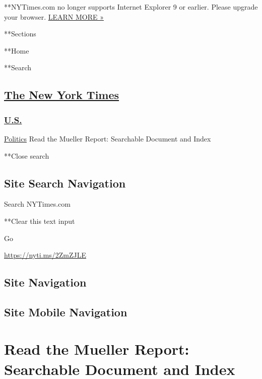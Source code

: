  **NYTimes.com no longer supports Internet Explorer 9 or earlier. Please
upgrade your browser.
\href{http://www.nytimes3xbfgragh.onion/content/help/site/ie9-support.html}{LEARN
MORE »}

**Sections

**Home

**Search

\hypertarget{the-new-york-times}{%
\subsection{\texorpdfstring{\href{http://www.nytimes3xbfgragh.onion/}{The
New York Times}}{The New York Times}}\label{the-new-york-times}}

\hypertarget{-us-}{%
\subsubsection{\texorpdfstring{
\href{https://www.nytimes3xbfgragh.onion/section/us}{U.S.}
}{ U.S. }}\label{-us-}}

 \href{/section/politics}{Politics} \textbar{}Read the Mueller Report:
Searchable Document and Index

**Close search

\hypertarget{site-search-navigation}{%
\subsection{Site Search Navigation}\label{site-search-navigation}}

Search NYTimes.com

**Clear this text input

Go

\url{https://nyti.ms/2ZmZJLE}

\hypertarget{site-navigation}{%
\subsection{Site Navigation}\label{site-navigation}}

\hypertarget{site-mobile-navigation}{%
\subsection{Site Mobile Navigation}\label{site-mobile-navigation}}

\hypertarget{read-the-mueller-report-searchable-document-and-index}{%
\section{Read the Mueller Report: Searchable Document and
Index}\label{read-the-mueller-report-searchable-document-and-index}}

